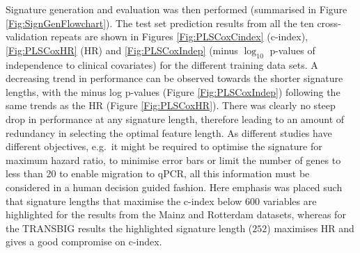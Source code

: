 \documentclass[letterpaper,12pt]{article}
\begin{document}
Signature generation and evaluation was then performed (summarised in Figure \ref{Fig:SignGenFlowchart}). The test set prediction results from all the ten cross-validation repeats are shown in Figures \ref{Fig:PLSCoxCindex} (c-index), \ref{Fig:PLSCoxHR} (HR) and \ref{Fig:PLSCoxIndep} (minus $\log_{10}$ p-values of independence to clinical covariates) for the different training data sets. A decreasing trend in performance can be observed towards the shorter signature lengths, with the minus log p-values (Figure \ref{Fig:PLSCoxIndep}) following the same trends as the HR (Figure \ref{Fig:PLSCoxHR}). There was clearly no steep drop in performance at any signature length, therefore leading to an amount of redundancy in selecting the optimal feature length. As different studies have different objectives, e.g.\ it might be required to optimise the signature for maximum hazard ratio, to minimise error bars or limit the number of genes to less than 20 to enable migration to qPCR, all this information must be considered in a human decision guided fashion. Here emphasis was placed such that signature lengths that maximise the c-index below $600$ variables are highlighted for the results from the Mainz and Rotterdam datasets, whereas for the TRANSBIG results the highlighted signature length ($252$) maximises HR and gives a good compromise on c-index.


%
%
\end{document}
